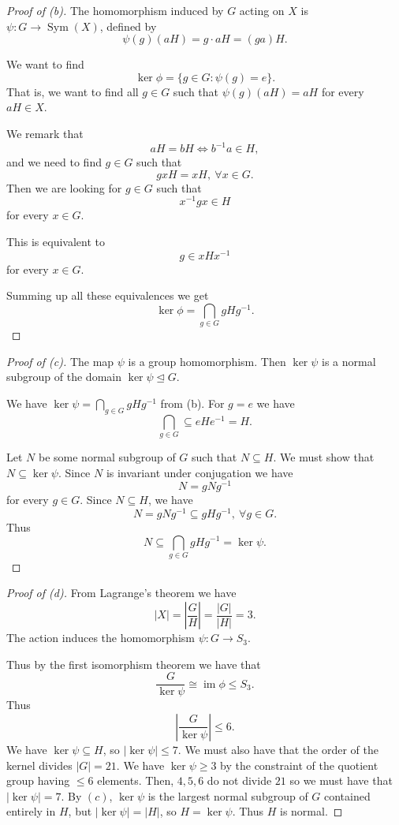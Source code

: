 \begin{proof}[Proof of (b)]
    The homomorphism induced by $G$ 
    acting on $X$ is $\psi : G \to \operatorname{Sym}(X)$, 
    defined by 
    \[
        \psi(g)(aH) = g \cdot aH = (ga)H. 
    \]

    We want to find 
    \[
        \ker \phi = \{g \in G : \psi(g) = e\}.
    \]
    That is, we want to find all $g \in G$ such that 
    $\psi(g)(aH) = aH$ for every $aH \in X$.

    We remark that 
    \[
        aH = bH \Leftrightarrow b^{-1}a \in H, 
    \]
    and we need to find $g \in G$ such that 
    \[
        gxH = xH, \ \forall x \in G.
    \]
    Then we are looking for $g \in G$ such that 
    \[
        x^{-1}gx \in H
    \]
    for every $x \in G$. 

    This is equivalent to 
    \[
        g \in xHx^{-1} 
    \]
    for every $x \in G$. 

    Summing up all these equivalences we get 
    \[
        \ker \phi 
        = \bigcap_{g \in G} gHg^{-1}.
    \]

\end{proof}
\begin{proof}[Proof of (c)]
    The map $\psi$ is a group homomorphism. Then 
    $\ker \psi$ is a normal subgroup of the domain 
    $\ker \psi \trianglelefteq G$. 

    We have $\ker \psi = \bigcap_{g \in G} gHg^{-1}$ 
    from (b). For $g = e$ we have 
    \[
        \bigcap_{g\in G} \subseteq eHe^{-1} = H. 
    \]

    Let $N$ be some normal subgroup of $G$ such that 
    $N \subseteq H$. We must show that 
    $N \subseteq \ker \psi$. Since $N$ is invariant 
    under conjugation we have 
    \[
        N = gNg^{-1}
    \]
    for every $g \in G$.
    Since $N \subseteq H$, we have 
    \[
        N = gNg^{-1} \subseteq gHg^{-1}, \ \forall g \in G.
    \]
    Thus 
    \[
        N \subseteq \bigcap_{g \in G} gHg^{-1} 
        = \ker \psi.
    \]
\end{proof}
\begin{proof}[Proof of (d)]
    From Lagrange's theorem we have 
    \[
        |X| = \left|\frac{G}{H}\right|
        = \frac{|G|}{|H|} = 3. 
    \]
    The action induces the 
    homomorphism 
    $\psi : G \to S_3$. 

    Thus by the first isomorphism theorem 
    we have that 
    \[
        \frac{G}{\ker \psi} \cong \operatorname{im}
        \phi \leq S_3. 
    \]
    Thus 
    \[
        \left|\frac{G}{\ker \psi}\right| \leq 6. 
    \]
    We have $\ker \psi \subseteq H$, so 
    $|\ker \psi| \leq 7$. We must also have that 
    the order of the kernel divides $|G| = 21$. 
    We have $\ker \psi \geq 3$ by the constraint 
    of the quotient group having $\leq 6$ elements. 
    Then, $4,5,6$ do not divide $21$ so we must 
    have that $|\ker \psi| = 7$. By $(c)$, 
    $\ker \psi$ is the largest normal subgroup 
    of $G$ contained entirely in $H$, but 
    $|\ker \psi| = |H|$, so $H = \ker \psi$. 
    Thus $H$ is normal.
\end{proof}

